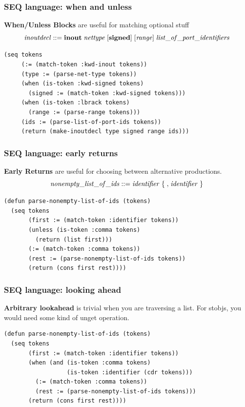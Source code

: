 \documentclass{beamer}
\begin{document}
\begin{frame}[fragile]
\frametitle{SEQ language: when and unless}
{\bf When/Unless Blocks} are useful for matching optional stuff
\[
\mathit{inoutdecl} ::= {\bf inout} \; \mathit{nettype} \; [{\bf signed}] \; [\mathit{range}] \; \mathit{list\_of\_port\_identifiers}
\]

\begin{verbatim}
(seq tokens
     (:= (match-token :kwd-inout tokens))
     (type := (parse-net-type tokens))
     (when (is-token :kwd-signed tokens)
       (signed := (match-token :kwd-signed tokens)))
     (when (is-token :lbrack tokens)
       (range := (parse-range tokens)))
     (ids := (parse-list-of-port-ids tokens))
     (return (make-inoutdecl type signed range ids)))
\end{verbatim}

\end{frame}

\begin{frame}[fragile]
\frametitle{SEQ language: early returns}
{\bf Early Returns} are useful for choosing between alternative productions.
\[
\mathit{nonempty\_list\_of\_ids} ::= \mathit{identifier} \; \{ \; {\bf ,} \; \mathit{identifier} \; \} 
\]
\begin{verbatim}
(defun parse-nonempty-list-of-ids (tokens)
  (seq tokens
       (first := (match-token :identifier tokens))
       (unless (is-token :comma tokens)
         (return (list first)))
       (:= (match-token :comma tokens))
       (rest := (parse-nonempty-list-of-ids tokens))
       (return (cons first rest))))
\end{verbatim}
\end{frame}

\begin{frame}[fragile]
\frametitle{SEQ language: looking ahead}

{\bf Arbitrary lookahead} is trivial when you are traversing a list.  For
stobjs, you would need some kind of unget operation.

{\small
\begin{verbatim}
(defun parse-nonempty-list-of-ids (tokens)
  (seq tokens 
       (first := (match-token :identifier tokens))
       (when (and (is-token :comma tokens)
                  (is-token :identifier (cdr tokens)))
         (:= (match-token :comma tokens))
         (rest := (parse-nonempty-list-of-ids tokens)))
       (return (cons first rest))))
\end{verbatim}}
\end{frame}
\end{document}
